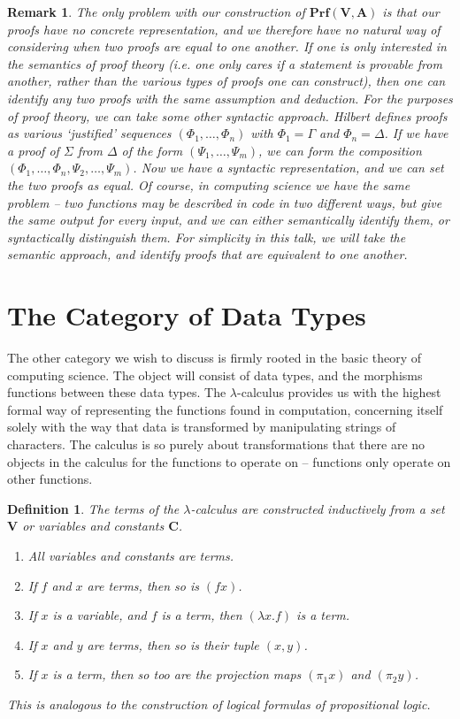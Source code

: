 \documentclass{article}
\theoremstyle{plain}
\newtheorem{definition}{Definition}
\newtheorem*{remark}{Remark}
\begin{document}
\begin{remark}
    The only problem with our construction of $\mathbf{Prf}(\mathbf{V},\mathbf{A})$ is that our proofs have no concrete representation, and we therefore have no natural way of considering when two proofs are equal to one another. If one is only interested in the semantics of proof theory (i.e. one only cares {\it if} a statement is provable from another, rather than the various types of proofs one can construct), then one can identify any two proofs with the same assumption and deduction. For the purposes of proof theory, we can take some other syntactic approach. Hilbert defines proofs as various `justified' sequences $(\Phi_1, \dots, \Phi_n)$ with $\Phi_1 = \Gamma$ and $\Phi_n = \Delta$. If we have a proof of $\Sigma$ from $\Delta$ of the form $(\Psi_1, \dots, \Psi_m)$, we can form the composition $(\Phi_1, \dots, \Phi_n, \Psi_2, \dots, \Psi_m)$. Now we have a syntactic representation, and we can set the two proofs as equal. Of course, in computing science we have the same problem -- two functions may be described in code in two different ways, but give the same output for every input, and we can either {\it semantically} identify them, or syntactically distinguish them. For simplicity in this talk, we will take the semantic approach, and identify proofs that are equivalent to one another.
\end{remark}

\section{The Category of Data Types}

The other category we wish to discuss is firmly rooted in the basic theory of computing science. The object will consist of data types, and the morphisms functions between these data types. The $\lambda$-calculus provides us with the highest formal way of representing the functions found in computation, concerning itself solely with the way that data is transformed by manipulating strings of characters. The calculus is so purely about transformations that there are no objects in the calculus for the functions to operate on -- functions only operate on other functions.

\begin{definition}
    The terms of the $\lambda$-calculus are constructed inductively from a set $\mathbf{V}$ or variables and constants $\mathbf{C}$.
    \begin{enumerate}
        \item All variables and constants are terms.
        \item If $f$ and $x$ are terms, then so is $(fx)$.
        \item If $x$ is a variable, and $f$ is a term, then $(\lambda x.f)$ is a term.
        \item If $x$ and $y$ are terms, then so is their tuple $(x,y)$.
        \item If $x$ is a term, then so too are the projection maps $(\pi_1 x)$ and $(\pi_2 y)$.
    \end{enumerate}
    This is analogous to the construction of logical formulas of propositional logic.
\end{definition}
\end{document}
